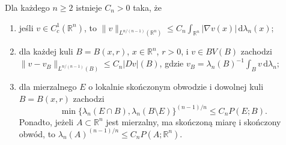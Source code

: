 \begin{lemat}
\label{lem:dg-relative-isoperimetric}
Dla każdego $n\ge2$ istnieje $C_n>0$ taka, że
\begin{enumerate}[label=(\roman*)]
\item jeśli $v\in C_c^1(\mathbb R^n)$, to
 $\|v\|_{L^{n/(n-1)}(\mathbb R^n)}\le
 C_n\int_{\mathbb R^n}|\nabla v(x)|\,\mathrm d\lambda_n(x)$;
\item dla każdej kuli $B=B(x,r)$, $x\in\mathbb R^n$,
 $r>0$, i $v\in BV(B)$ zachodzi
 $\|v-v_B\|_{L^{n/(n-1)}(B)}\le C_n|Dv|(B)$,
 gdzie $v_B=\lambda_n(B)^{-1}\int_Bv\,\mathrm d\lambda_n$;
\item dla mierzalnego $E$ o lokalnie skończonym obwodzie
 i dowolnej kuli $B=B(x,r)$ zachodzi
 \[
 \min\{\lambda_n(E\cap B),\lambda_n(B\setminus E)\}^{(n-1)/n}
 \le C_n P(E;B).
 \]
 Ponadto, jeżeli $A\subset\mathbb R^n$ jest mierzalny,
 ma skończoną miarę i skończony obwód, to
 $\lambda_n(A)^{(n-1)/n}\le C_nP(A;\mathbb R^n)$.
\end{enumerate}
\end{lemat}
